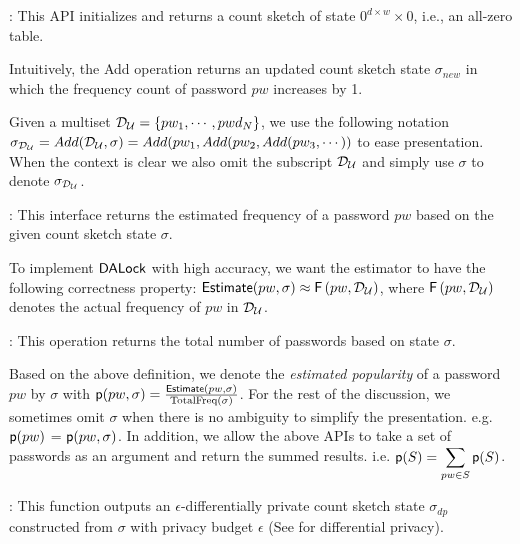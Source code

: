 : This API initializes and returns a count sketch of state $0^{d\times w}\times 0$, i.e., an all-zero table.


 Intuitively, the Add operation returns an updated count sketch state $\sigma_{new}$ in which the frequency count of password $pw$ increases by 1.

Given a multiset $\mathcal{D}_{{\mathcal{U}}} = \{pw_1,\cdots,pwd_N\}$, we use the following notation $\sigma_{\mathcal{D}_{{\mathcal{U}}}} =  Add(\mathcal{D}_{{\mathcal{U}}},\sigma) \\= Add(pw_1, Add(pw_2,Add(pw_3,\cdots))$ to ease presentation. When the context is clear we also omit the subscript $\mathcal{D}_{{\mathcal{U}}}$ and simply use $\sigma$ to denote $\sigma_{\mathcal{D}_{{\mathcal{U}}}}$.


: This interface returns the estimated frequency of a password $pw$ based on the given count sketch state $\sigma$.


To implement $\mathsf{DALock}$ with high accuracy, we want the estimator to have the following correctness property: $\textsf{Estimate}(pw,\sigma) \approx \mathsf{F}\left(pw, \mathcal{D}_{{\mathcal{U}}} \right)$, where $\mathsf{F}\left(pw, \mathcal{D}_{{\mathcal{U}}}\right)$ denotes the actual frequency of $pw$ in $\mathcal{D}_{{\mathcal{U}}}$.


: This operation returns the total number of passwords based on state $\sigma$.


Based on the above definition, we denote the \emph{estimated popularity} of a password $pw$ by $\sigma$ with $\textsf{p}(pw,\sigma) = \frac{\textsf{Estimate}(pw,\sigma)}{\text{TotalFreq}(\sigma)}$. For the rest of the discussion, we sometimes omit $\sigma$ when there is no ambiguity to simplify the presentation. e.g. $\textsf{p}(pw)$ = $\textsf{p}(pw,\sigma)$. In addition, we allow the above APIs to take a set of passwords as an argument and return the summed results. i.e. $\textsf{p}(S) = \displaystyle{\sum_{pw \in S} \textsf{p}(S)}$. 


: This function outputs an $\epsilon$-differentially private count sketch state $\sigma_{dp}$ constructed from $\sigma$ with privacy budget $\epsilon$ (See  for differential privacy).



\vspace{-0.08cm}

